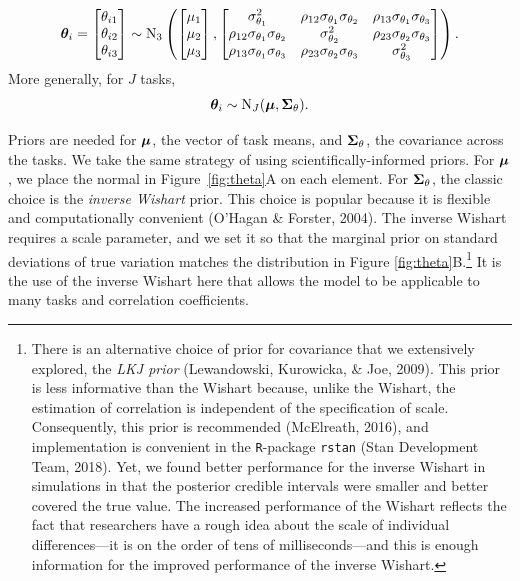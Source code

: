 \documentclass[
  ,man]{apa6}
\begin{document}
\[
\bm \theta_i=\begin{bmatrix} \theta_{i1}\\ \theta_{i2} \\ \theta_{i3}\end{bmatrix} 
\sim \mbox{N}_3 \left( \begin{bmatrix} \mu_1\\\mu_2\\\mu_3\end{bmatrix},
\begin{bmatrix}
\sigma^2_{\theta_1} & \rho_{12}\sigma_{\theta_1}\sigma_{\theta_2} & \rho_{13}\sigma_{\theta_1}\sigma_{\theta_3}\\
\rho_{12}\sigma_{\theta_1}\sigma_{\theta_2} & \sigma_{\theta_2}^2 & \rho_{23}\sigma_{\theta_2}\sigma_{\theta_3}\\
\rho_{13}\sigma_{\theta_1}\sigma_{\theta_3} & \rho_{23}\sigma_{\theta_2}\sigma_{\theta_3} & \sigma_{\theta_3}^2\\
\end{bmatrix}
\right).
\]
More generally, for \(J\) tasks,
\begin{equation}
\label{eq:Sig}
\bm \theta_i \sim \mbox{N}_J(\bm \mu,\bm \Sigma_\theta).
\end{equation}

Priors are needed for \(\bm \mu\), the vector of task means, and \(\bm \Sigma_\theta\), the covariance across the tasks. We take the same strategy of using scientifically-informed priors. For \(\bm \mu\), we place the normal in Figure~\ref{fig:theta}A on each element. For \(\bm \Sigma_\theta\), the classic choice is the \emph{inverse Wishart} prior. This choice is popular because it is flexible and computationally convenient (O'Hagan \& Forster, 2004). The inverse Wishart requires a scale parameter, and we set it so that the marginal prior on standard deviations of true variation matches the distribution in Figure \ref{fig:theta}B.\footnote{There is an alternative choice of prior for covariance that we extensively explored, the \emph{LKJ prior} (Lewandowski, Kurowicka, \& Joe, 2009). This prior is less informative than the Wishart because, unlike the Wishart, the estimation of correlation is independent of the specification of scale. Consequently, this prior is recommended (McElreath, 2016), and implementation is convenient in the \texttt{R}-package \texttt{rstan} (Stan Development Team, 2018). Yet, we found better performance for the inverse Wishart in simulations in that the posterior credible intervals were smaller and better covered the true value. The increased performance of the Wishart reflects the fact that researchers have a rough idea about the scale of individual differences---it is on the order of tens of milliseconds---and this is enough information for the improved performance of the inverse Wishart.} It is the use of the inverse Wishart here that allows the model to be applicable to many tasks and correlation coefficients.
\end{document}
